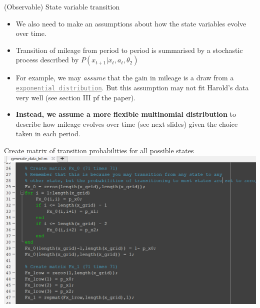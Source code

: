 \documentclass[aspectratio=169]{beamer}
\begin{document}
	
	\begin{frame}{(Observable) State variable transition}\label{transprob}
		\begin{itemize}
			\itemsep1em
			\item We also need to make an assumptions about how the state variables evolve over time.
			\item Transition of mileage from period to period is summarised by a stochastic process described by $P(x_{t+1}|x_t,a_t,\theta_2)$
			\item For example, we may \textit{assume} that the gain in mileage is a draw from a \hyperlink{transprob_exponential}{\textcolor{gray}{\texttt{exponential distribution}}}. But this assumption may not fit Harold's data very well (see section III pf the paper).
			\item \textbf{Instead, we assume a more flexible multinomial distribution} to describe how mileage evolves over time (see next slides) given the choice taken in each period.
		\end{itemize}
		
	\end{frame}
	
	\begin{frame}{Create matrix of transition probabilities for all possible states}
		\includegraphics[width=\textwidth]{figs/2_transmat.PNG}
	\end{frame}
	
\end{document}

